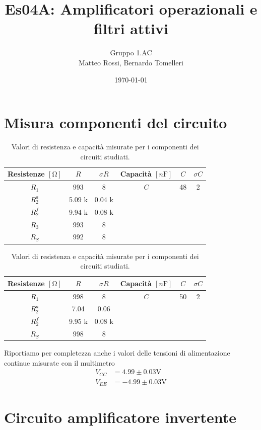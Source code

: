 \documentclass[10pt,a4paper]{article}
\author{Gruppo 1.AC \\ Matteo Rossi, Bernardo Tomelleri}
\title{Es04A: Amplificatori operazionali e filtri attivi}
\begin{document}
\date{\today}
\maketitle

\setcounter{section}{0}

\section*{Misura componenti del circuito}
\begin{table}[htbp]
\centering
\begin{tabular}{cccccc}
\toprule
Resistenze $[\si{\ohm}]$ & $R$ & $\sigma R$ & Capacità $[\si{n\F}]$ & $C$ &
$\sigma C$ \\
\midrule
\midrule
$R_1$	  & 993 	& 8 	 & $C$ & 48			 & 2 \\
$R_2^a$	  & 5.09 k	& 0.04 k 	 & & &	\\
$R_2^f$	  & 9.94 k		& 0.08 k & 		& 		 &	\\
$R_3$	  & 993		& 8		 &				&				 &		\\
$R_S$	  & 992		& 8		 &				&				 &		\\
\bottomrule     
\end{tabular}
\caption{Valori di resistenza e capacità misurate per i componenti dei
circuiti studiati. \label{tab: rcmes_B}}

\begin{tabular}{cccccc}
\toprule
Resistenze $[\si{\ohm}]$ & $R$ & $\sigma R$ & Capacità $[\si{n\F}]$ & $C$ &
$\sigma C$ \\
\midrule
\midrule
$R_1$	  & 998 	& 8 	 & $C$ & 50			 & 2 \\
$R_2^a$	  & 7.04	& 0.06 	 & & &	\\
$R_2^f$	  & 9.95 k	& 0.08 k & & &	\\
$R_S$	  & 998		& 8		 & & &	\\
\bottomrule     
\end{tabular}
\caption{Valori di resistenza e capacità misurate per i componenti dei
circuiti studiati. \label{tab: rcmes_M}}
\end{table}
Riportiamo per completezza anche i valori delle tensioni di alimentazione
continue misurate con il multimetro
\begin{align*}
V_{CC} &= 4.99 \pm 0.03 \si{\V} \\
V_{EE} &= -4.99 \pm 0.03 \si{\V}
\end{align*}

\section{Circuito amplificatore invertente}
\end{document}
